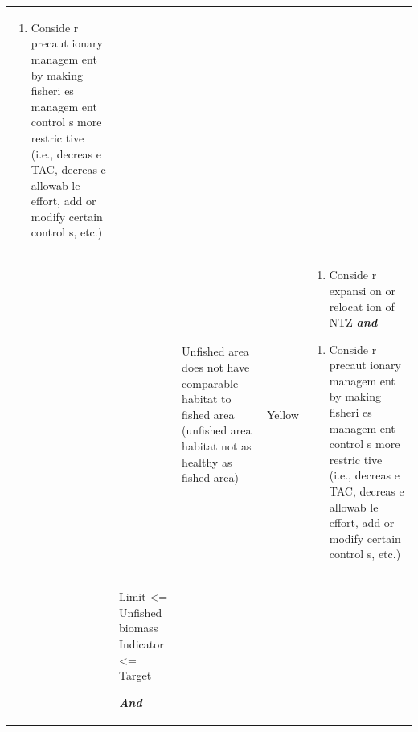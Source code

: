 \documentclass[]{book}
\providecommand{\tightlist}{%
  \setlength{\itemsep}{0pt}\setlength{\parskip}{0pt}}
\begin{document}
\begin{longtable}[]{@{}lllll@{}}
\begin{minipage}[t]{0.19\columnwidth}
\begin{enumerate}
\def\labelenumi{\arabic{enumi}.}
\tightlist
\item
  Conside r precaut ionary managem ent by making fisheri es managem ent
  control s more restric tive (i.e., decreas e TAC, decreas e allowab le
  effort, add or modify certain control s, etc.)
\end{enumerate}\strut
\end{minipage}\tabularnewline
\begin{minipage}[t]{0.19\columnwidth}\raggedright\strut
\strut
\end{minipage} & \begin{minipage}[t]{0.19\columnwidth}\raggedright\strut
\strut
\end{minipage} & \begin{minipage}[t]{0.19\columnwidth}\raggedright\strut
Unfished area does not have comparable habitat to fished area (unfished
area habitat not as healthy as fished area)\strut
\end{minipage} & \begin{minipage}[t]{0.19\columnwidth}\raggedright\strut
Yellow\strut
\end{minipage} & \begin{minipage}[t]{0.19\columnwidth}\raggedright\strut
\begin{enumerate}
\def\labelenumi{\arabic{enumi}.}
\tightlist
\item
  Conside r expansi on or relocat ion of NTZ \textbf{\emph{and} }
\end{enumerate}

\begin{enumerate}
\def\labelenumi{\arabic{enumi}.}
\tightlist
\item
  Conside r precaut ionary managem ent by making fisheri es managem ent
  control s more restric tive (i.e., decreas e TAC, decreas e allowab le
  effort, add or modify certain control s, etc.)
\end{enumerate}\strut
\end{minipage}\tabularnewline
\begin{minipage}[t]{0.19\columnwidth}\raggedright\strut
\strut
\end{minipage} & \begin{minipage}[t]{0.19\columnwidth}\raggedright\strut
Limit \textless{}= Unfished biomass Indicator \textless{}= Target

\textbf{\emph{And}}


\end{minipage}
\end{longtable}
\end{document}
